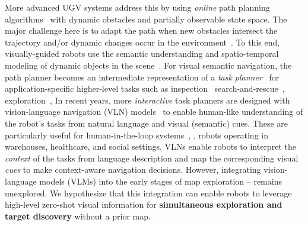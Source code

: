More advanced UGV systems address this by using \textit{online} path planning algorithms~\cite{mistri2022automated,mohsen2019new} with dynamic obstacles and partially observable state space. The major challenge here is to adapt the path when new obstacles intersect the trajectory and/or dynamic changes occur in the environment~\cite{das2020modified}. To this end, visually-guided robots use the semantic understanding and spatio-temporal modeling of dynamic objects in the scene~\cite{humblot2022navigation,martins2020extending}. For visual semantic navigation, the path planner becomes an intermediate representation of a \textit{task planner}~\cite{rana2023sayplan} for application-specific higher-level tasks such as inspection~\cite{wyrkabkiewicz2020local} search-and-rescue~\cite{wang2023maritime}, exploration~\cite{liang2021sscnav}, \etc In recent years, more \textit{interactive} task planners are designed with vision-language navigation (VLN) models~\cite{huang2023visual,Gadre2022CoWsOP} to enable human-like understanding of the robot's tasks from natural language and visual (semantic) cues. These are particularly useful for human-in-the-loop systems~\cite{islam2018person}, \eg, robots operating in warehouses, healthcare, and social settings. VLNs enable robots to interpret the \textit{context} of the tasks from language description and map the corresponding visual \textit{cues} to make context-aware navigation decisions. However, integrating vision-language models (VLMs) into the early stages of map exploration -- remains unexplored. We hypothesize that this integration can enable robots to leverage high-level zero-shot visual information for \textbf{simultaneous exploration and target discovery} without a prior map.





